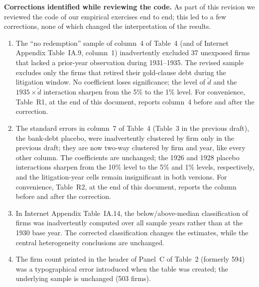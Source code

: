 \bigskip
\noindent\textbf{Corrections identified while reviewing the code.}
As part of this revision we reviewed the code of our empirical exercises end to end; this led to a few corrections, none of which changed the interpretation of the results.
\begin{enumerate}
\item The ``no redemption'' sample of column~4 of Table~4 (and of Internet Appendix Table~IA.9, column~1) inadvertently excluded 37 unexposed firms that lacked a prior-year observation during 1931--1935. The revised sample excludes only the firms that retired their gold-clause debt during the litigation window. No coefficient loses significance; the level of $\tilde{d}$ and the $1935\times\tilde{d}$ interaction sharpen from the 5\% to the 1\% level. For convenience, Table~R1, at the end of this document, reports column~4 before and after the correction.
\item The standard errors in column~7 of Table~4 (Table~3 in the previous draft), the bank-debt placebo, were inadvertently clustered by firm only in the previous draft; they are now two-way clustered by firm and year, like every other column. The coefficients are unchanged; the 1926 and 1928 placebo interactions sharpen from the 10\% level to the 5\% and 1\% levels, respectively, and the litigation-year cells remain insignificant in both versions. For convenience, Table~R2, at the end of this document, reports the column before and after the correction.
\item In Internet Appendix Table~IA.14, the below/above-median classification of firms was inadvertently computed over all sample years rather than at the 1930 base year. The corrected classification changes the estimates, while the central heterogeneity conclusions are unchanged.
\item The firm count printed in the header of Panel~C of Table~2 (formerly 594) was a typographical error introduced when the table was created; the underlying sample is unchanged (503 firms).
\end{enumerate}
